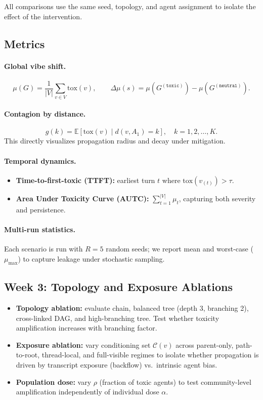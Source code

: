 \documentclass[11pt]{article}
\begin{document}
All comparisons use the same seed, topology, and agent assignment to isolate the effect
of the intervention.

\subsection{Metrics}

\paragraph{Global vibe shift.}
\[
\mu(G)=\frac{1}{|V|}\sum_{v\in V}\mathrm{tox}(v), \qquad
\Delta\mu(s)=\mu(G^{(\texttt{toxic})})-\mu(G^{(\texttt{neutral})}).
\]

\paragraph{Contagion by distance.}
\[
g(k)=\mathbb{E}[\mathrm{tox}(v)\mid d(v,A_1)=k],\quad k=1,2,\dots,K.
\]
This directly visualizes propagation radius and decay under mitigation.

\paragraph{Temporal dynamics.}
\begin{itemize}[noitemsep]
  \item \textbf{Time-to-first-toxic (TTFT):} earliest turn $t$ where $\mathrm{tox}(v_{(t)}) > \tau$.
  \item \textbf{Area Under Toxicity Curve (AUTC):} $\sum_{t=1}^{|V|}\mu_t$, capturing both severity and persistence.
\end{itemize}

\paragraph{Multi-run statistics.}
Each scenario is run with $R = 5$ random seeds; we report mean and worst-case
($\mu_{\max}$) to capture leakage under stochastic sampling.

\subsection{Week 3: Topology and Exposure Ablations}

\begin{itemize}[noitemsep]
  \item \textbf{Topology ablation:} evaluate chain, balanced tree (depth 3, branching 2),
  cross-linked DAG, and high-branching tree. Test whether toxicity amplification
  increases with branching factor.
  \item \textbf{Exposure ablation:} vary conditioning set $\mathcal{C}(v)$ across
  parent-only, path-to-root, thread-local, and full-visible regimes to isolate
  whether propagation is driven by transcript exposure (backflow) vs.\ intrinsic agent bias.
  \item \textbf{Population dose:} vary $\rho$ (fraction of toxic agents) to test
  community-level amplification independently of individual dose $\alpha$.
\end{itemize}
\end{document}
